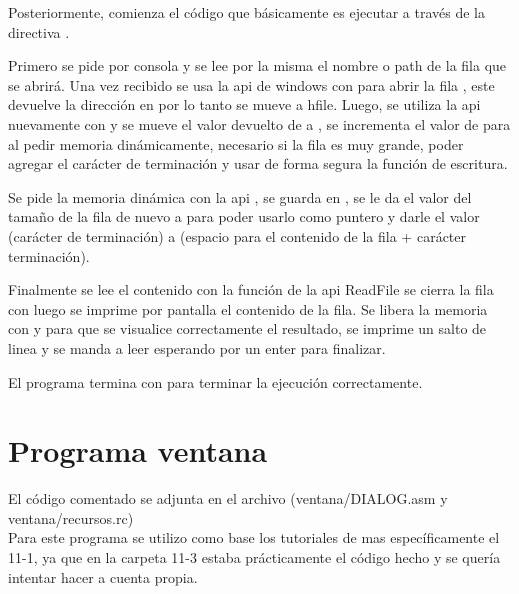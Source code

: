 \vspace{0.5cm}

Posteriormente, comienza el código que básicamente es ejecutar 
a través de la directiva .


Primero se pide por consola y se lee por la misma el nombre o path de la fila
que se abrirá. Una vez recibido se usa la api de windows con  para
abrir la fila \Cite{MicrosoftCreateFileA}, este devuelve la dirección en 
por lo tanto se mueve a hfile. Luego, se utiliza la api nuevamente con 
\Cite{Windowsgetsize} y se mueve el valor devuelto de  a
, se incrementa el valor de  para al pedir
memoria dinámicamente, necesario si la fila es muy grande, poder agregar el
carácter de terminación y usar de forma segura la función de escritura.


Se pide la memoria dinámica con la api  \Cite{GlobalAlloc},
se guarda en , se le da el valor del tamaño de la fila de nuevo a
 para poder usarlo como puntero y darle el valor 
(carácter de terminación) a  (espacio para el contenido de la
fila + carácter terminación).


Finalmente se lee el contenido con la función de la api ReadFile
\Cite{MicrosoftReadFile} se cierra la fila con 
\Cite{CloseHandle}
luego se imprime por pantalla el contenido de la fila. Se libera la memoria con
 y para que se visualice correctamente el resultado, se
imprime un salto de linea y se manda a leer esperando por un enter para finalizar.


El programa termina con  para terminar la ejecución
correctamente.





\section{Programa ventana}

El código comentado se adjunta en el archivo
(ventana/DIALOG.asm y ventana/recursos.rc)\\


Para este programa se utilizo como base los tutoriales de 
\Cite{Iczelion}
mas específicamente el 11-1, ya que en la carpeta 11-3 estaba prácticamente el
código hecho y se quería intentar hacer a cuenta propia.


